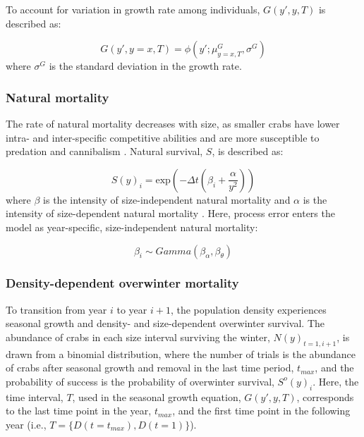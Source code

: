 \documentclass{article}
\begin{document}
To account for variation in growth rate among individuals, $G(y',y, T)$ is described as:

\begin{equation}
G(y',y=x, T) = \phi(y'; \mu^G_{y=x, T}, \sigma^G)
\end{equation}
where $\sigma^G$ is the standard deviation in the growth rate.

\subsubsection*{Natural mortality}

The rate of natural mortality decreases with size, as smaller crabs have lower intra- and inter-specific competitive abilities and are more susceptible to predation and cannibalism \parencite{maszczyk2018body, grosholz2021stage}. Natural survival, $S$, is described as: 

\begin{equation}
S(y)_i = \text{exp}\left(-\Delta t(\beta_i+\frac{\alpha}{y^2})\right)
\end{equation}
where $\beta$ is the intensity of size-independent natural mortality and $\alpha$ is the intensity of size-dependent natural mortality \parencite{carlson2010bayesian}. Here, process error enters the model as year-specific, size-independent natural mortality:

\begin{equation}
\beta_i \sim Gamma(\beta_{\alpha}, \beta_{\theta})
\end{equation}

\subsubsection*{Density-dependent overwinter mortality}

To transition from year $i$ to year $i+1$, the population density experiences seasonal growth and density- and size-dependent overwinter survival. The abundance of crabs in each size interval surviving the winter, $N(y)_{t=1,i+1}$, is drawn from a binomial distribution, where the number of trials is the abundance of crabs after seasonal growth and removal in the last time period, $t_{max}$, and the probability of success is the probability of overwinter survival, $S^o(y)_i$. Here, the time interval, $T$, used in the seasonal growth equation, $G(y',y,T)$, corresponds to the last time point in the year, $t_{max}$, and the first time point in the following year (i.e., $T=\{D(t=t_{max}), D(t=1)\}$). 
\end{document}
